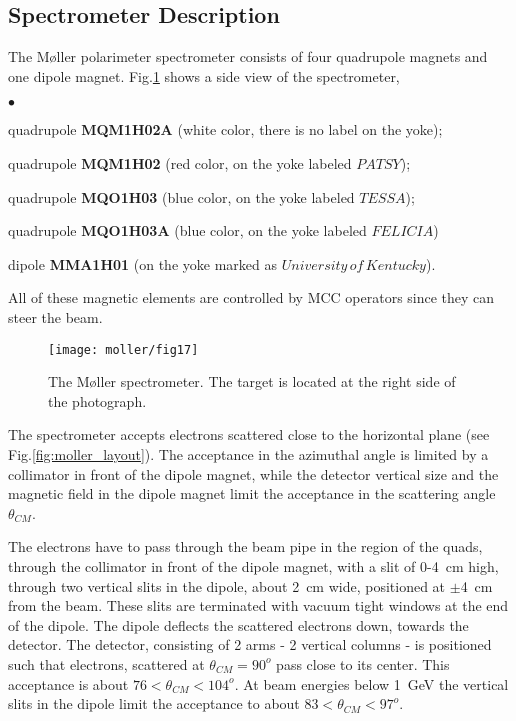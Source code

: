 {\subsection {Spectrometer Description }
\label{sec:moller_compon_spectr}
\vspace{-\parskip}
The M{\o}ller polarimeter spectrometer consists of four quadrupole magnets and one
 dipole magnet. Fig.\ref{fig:spectrometer} shows a side view
 of the spectrometer,
\vspace{-\parskip}
\begin{list}{$\bullet$}{\setlength{\itemsep}{-0.10cm}}
   \item quadrupole {\bf MQM1H02A} (white color, there is no label on the yoke);
   \item quadrupole {\bf MQM1H02} (red color, on the yoke labeled {\bf $PATSY$});
   \item quadrupole {\bf MQO1H03} (blue color, on the yoke labeled {\bf $TESSA$}); 
   \item quadrupole {\bf MQO1H03A} (blue color, on the yoke labeled {\bf $FELICIA$})
   \item dipole {\bf MMA1H01} (on the yoke marked as {\bf $University \, of \,
    Kentucky$}).
\end{list} 
\vspace{-\parskip}
All of these magnetic elements are controlled by MCC operators since they can steer the beam. 

   \begin{figure}%
      \begin{center}
          \texttt{[image: moller/fig17]}
      \end{center}
      \caption[M{\o}ller:spectrometer]{The M{\o}ller spectrometer. The target is located at the right
            side of the photograph.
            }
      \label{fig:spectrometer} 
   \end{figure}  

The spectrometer accepts electrons scattered close to the horizontal 
plane (see Fig.\ref{fig:moller_layout}). The acceptance in the azimuthal
angle is limited by a collimator in front of the dipole magnet, while
the detector vertical size and the magnetic field in the dipole magnet limit 
the acceptance in the scattering angle $\theta_{CM}$.

The electrons have to pass through the beam pipe in the 
region of the quads, through the collimator in front of 
the dipole magnet, with a slit of 0-4~cm high, through two vertical
slits in the dipole, about 2~cm wide, positioned at $\pm$4~cm 
from the beam. These slits are terminated with vacuum tight windows
at the end of the dipole. The dipole deflects the scattered 
electrons down, towards the detector. The detector, consisting
of 2 arms - 2 vertical columns - is positioned such that electrons, 
scattered at $\theta_{CM}=90^o$ pass close to its center. 
This acceptance is about $76<\theta_{CM}<104^o$. At beam energies below 1~GeV
the vertical slits in the dipole limit the acceptance to about
$83<\theta_{CM}<97^o$.

}
